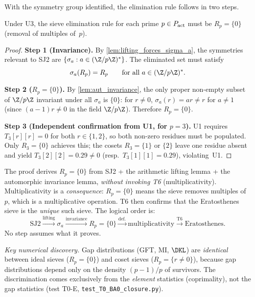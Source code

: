 \documentclass[12pt,a4paper]{article}
\begin{document}
With the symmetry group identified, the elimination rule follows
in two steps.

\begin{lemma}[SJ2 forces $R_p = \{0\}$]
\label{lem:sj2_Rp}
Under U3, the sieve elimination rule for each prime $p \in P_{\rm act}$
must be $R_p = \{0\}$ (removal of multiples of~$p$).
\end{lemma}

\begin{proof}
\textbf{Step 1 (Invariance).}
By \cref{lem:lifting_forces_sigma_a}, the symmetries relevant to
SJ2 are $\{\sigma_a : a \in (\Z/p\Z)^*\}$.  The eliminated set
must satisfy
\begin{equation}
  \sigma_a(R_p) = R_p \qquad \text{for all } a \in (\Z/p\Z)^*.
  \label{eq:Rp_invariance}
\end{equation}

\textbf{Step 2 ($R_p = \{0\}$).}
By \cref{lem:aut_invariance}, the only proper non-empty subset of
$\Z/p\Z$ invariant under all $\sigma_a$ is $\{0\}$: for $r \neq 0$,
$\sigma_a(r) = ar \neq r$ for $a \neq 1$ (since $(a-1)r \neq 0$
in the field $\Z/p\Z$).  Therefore $R_p = \{0\}$.

\textbf{Step 3 (Independent confirmation from U1, for $p = 3$).}
U1 requires $T_3[r][r] = 0$ for both $r \in \{1,2\}$, so both
non-zero residues must be populated.  Only $R_3 = \{0\}$ achieves
this; the cosets $R_3 = \{1\}$ or $\{2\}$ leave one residue absent
and yield $T_3[2][2] = 0.29 \neq 0$ (resp.\ $T_3[1][1] = 0.29$),
violating~U1.
\end{proof}

\begin{remark}
\label{rem:interpretive_step}
The proof derives $R_p = \{0\}$ from SJ2 + the arithmetic lifting
lemma + the automorphic invariance lemma, \emph{without invoking T6}
(multiplicativity).  Multiplicativity is a \emph{consequence}:
$R_p = \{0\}$ means the sieve removes multiples of~$p$, which is
a multiplicative operation.  T6 then confirms that the Eratosthenes
sieve is the \emph{unique} such sieve.  The logical order is:
\[
  \text{SJ2}
  \xrightarrow{\text{lifting}}
  \sigma_a
  \xrightarrow{\text{invariance}}
  R_p = \{0\}
  \xrightarrow{\text{def.}}
  \text{multiplicativity}
  \xrightarrow{\text{T6}}
  \text{Eratosthenes}.
\]
No step assumes what it proves.

\emph{Key numerical discovery.}
Gap distributions (GFT, MI, $\DKL$) are \emph{identical} between
ideal sieves ($R_p = \{0\}$) and coset sieves ($R_p = \{r \neq 0\}$),
because gap distributions depend only on the density $(p-1)/p$ of
survivors.  The discrimination comes exclusively from the
\emph{element} statistics (coprimality), not the gap statistics
(test T0-E, \texttt{test\_T0\_BA0\_closure.py}).
\end{remark}
\end{document}
